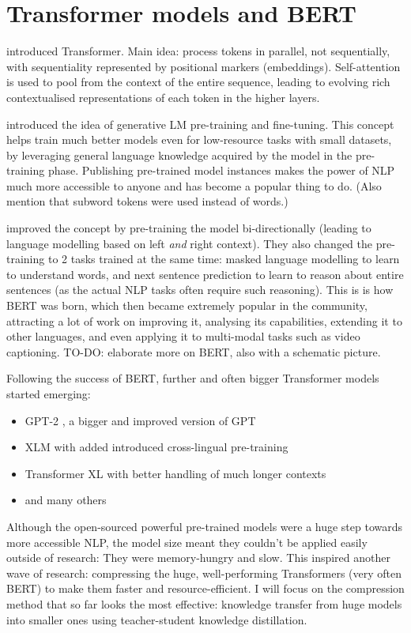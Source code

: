 \documentclass[bsc,frontabs,twoside,singlespacing,parskip,deptreport]{infthesis}
\begin{document}
{  \section{Transformer models and BERT}{
    \citet{Vaswani_2017} introduced Transformer. Main idea: process tokens in parallel, not sequentially, with sequentiality represented by positional markers (embeddings). Self-attention is used to pool from the context of the entire sequence, leading to evolving rich contextualised representations of each token in the higher layers.
    
    \citet{Radford_2018} introduced the idea of generative LM pre-training and fine-tuning. This concept helps train much better models even for low-resource tasks with small datasets, by leveraging general language knowledge acquired by the model in the pre-training phase. Publishing pre-trained model instances makes the power of NLP much more accessible to anyone and has become a popular thing to do. (Also mention that subword tokens were used instead of words.)
    
    \citet{Devlin_2018} improved the concept by pre-training the model bi-directionally (leading to language modelling based on left \textit{and} right context). They also changed the pre-training to 2 tasks trained at the same time: masked language modelling to learn to understand words, and next sentence prediction to learn to reason about entire sentences (as the actual NLP tasks often require such reasoning). This is is how BERT was born, which then became extremely popular in the community, attracting a lot of work on improving it, analysing its capabilities, extending it to other languages, and even applying it to multi-modal tasks such as video captioning. TO-DO: elaborate more on BERT, also with a schematic picture.
    
    Following the success of BERT, further and often bigger Transformer models started emerging:
    \begin{itemize}
      \item GPT-2 \citep{Radford_2019}, a bigger and improved version of GPT
      \item XLM \citep{Lample_2019} with added introduced cross-lingual pre-training
      \item Transformer XL \citep{Dai_2019} with better handling of much longer contexts
      \item and many others
    \end{itemize}

    Although the open-sourced powerful pre-trained models were a huge step towards more accessible NLP, the model size meant they couldn't be applied easily outside of research: They were memory-hungry and slow. 
    This inspired another wave of research: compressing the huge, well-performing Transformers (very often BERT) to make them faster and resource-efficient. 
    I will focus on the compression method that so far looks the most effective: knowledge transfer from huge models into smaller ones using teacher-student knowledge distillation.
  }

}
\end{document}
